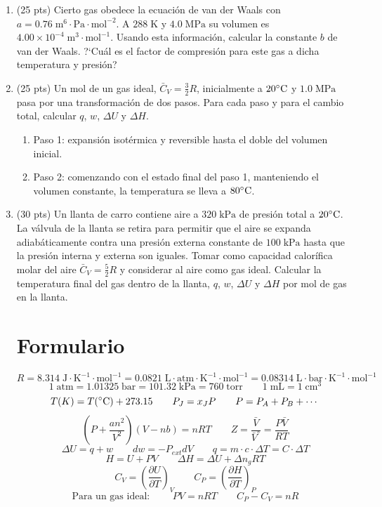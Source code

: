 \documentclass[a4paper,12pt]{article}
\begin{document}
\begin{enumerate}
 \item (25 pts) Cierto gas obedece la ecuaci\'on de van der Waals con $a=0.76\;\mbox{m}^6\cdot\mbox{Pa}\cdot\mbox{mol}^{-2}$. A $288\;\mbox{K}$ y $4.0\;\mbox{MPa}$ su volumen es $4.00\times 10^{-4}\;\mbox{m}^3\cdot\mbox{mol}^{-1}$. Usando esta informaci\'on, calcular la constante $b$ de van der Waals. ?`Cu\'al es el factor de compresi\'on para este gas a dicha temperatura y presi\'on?

 \item (25 pts) Un mol de un gas ideal, $\bar{C}_V=\frac{3}{2}R$, inicialmente a $20\celsius$ y $1.0\;\mbox{MPa}$ pasa por una transformaci\'on de dos pasos. Para cada paso y para el cambio total, calcular $q$, $w$, $\Delta U$ y $\Delta H$.
 \begin{enumerate}
  \item Paso 1: expansi\'on isot\'ermica y reversible hasta el doble del volumen inicial.
  \item Paso 2: comenzando con el estado final del paso 1, manteniendo el volumen constante, la temperatura se lleva a $80\celsius$.
 \end{enumerate}

 \item (30 pts) Un llanta de carro contiene aire a $320\;\mbox{kPa}$ de presi\'on total a $20\celsius$. La v\'alvula de la llanta se retira para permitir que el aire se expanda adiab\'aticamente contra una presi\'on externa constante de $100\;\mbox{kPa}$ hasta que la presi\'on interna y externa son iguales. Tomar como capacidad calor\'ifica molar del aire $\bar{C}_V=\frac{5}{2}R$ y considerar al aire como gas ideal. Calcular la temperatura final del gas dentro de la llanta, $q$, $w$, $\Delta U$ y $\Delta H$ por mol de gas en la llanta.

\section*{Formulario}

$$R=8.314\;\mbox{J}\cdot\mbox{K}^{-1}\cdot\mbox{mol}^{-1}=0.0821\;\mbox{L}\cdot\mbox{atm}\cdot\mbox{K}^{-1}\cdot\mbox{mol}^{-1}=0.08314\;\mbox{L}\cdot\mbox{bar}\cdot\mbox{K}^{-1}\cdot\mbox{mol}^{-1}$$
$$1\;\mbox{atm}=1.01325\;\mbox{bar}=101.32\;\mbox{kPa}=760\;\mbox{torr}\quad\quad 1\;\mbox{mL}=1\;\mbox{cm}^3$$
$$T(K)=T(\celsius)+273.15\quad\quad P_J=x_JP\quad\quad P=P_A+P_B+\cdots$$
$$\left(P+\frac{an^2}{V^2}\right)(V-nb)=nRT \quad\quad Z=\frac{\bar{V}}{\bar{V}^\circ}=\frac{P\bar{V}}{RT}$$
$$\Delta U=q+w\quad\quad dw=-P_{ext}dV\quad\quad q=m\cdot c\cdot\Delta T=C\cdot\Delta T$$
$$H=U+PV\quad\quad \Delta H=\Delta U+\Delta n_g RT$$
$$C_V=\left(\frac{\partial U}{\partial T}\right)_V\quad\quad C_P=\left(\frac{\partial H}{\partial T}\right)_P$$
$$\mbox{Para un gas ideal: }\quad\quad PV=nRT\quad\quad C_P-C_V=nR$$

\end{enumerate}
\end{document}
